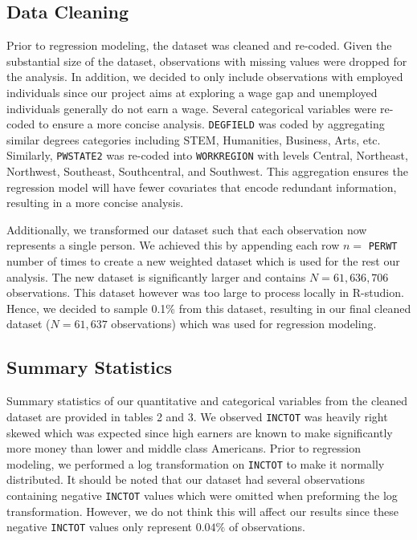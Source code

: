 \documentclass{article}
\begin{document}
\subsection*{Data Cleaning}
Prior to regression modeling, the dataset was cleaned and re-coded. Given the substantial size of the dataset, observations with missing values were dropped for the analysis. In addition, we decided to only include observations with employed individuals since our project aims at exploring a wage gap and unemployed individuals generally do not earn a wage. Several categorical variables were re-coded to ensure a more concise analysis. \texttt{DEGFIELD} was coded by aggregating similar degrees categories including STEM, Humanities, Business, Arts, etc. Similarly, \texttt{PWSTATE2} was re-coded into \texttt{WORKREGION} with levels Central, Northeast, Northwest, Southeast, Southcentral, and Southwest. This aggregation ensures the regression model will have fewer covariates that encode redundant information, resulting in a more concise analysis. 

Additionally, we transformed our dataset such that each observation now represents a single person. We achieved this by appending each row $n = $ \texttt{PERWT} number of times to create a new weighted dataset which is used for the rest our analysis. The new dataset is significantly larger and contains $N = 61,636,706$ observations. This dataset however was too large to process locally in R-studion. Hence, we decided to sample 0.1\% from this dataset, resulting in our final cleaned dataset ($N = 61,637$ observations)  which was used for regression modeling. 

\subsection*{Summary Statistics}
Summary statistics of our quantitative and categorical variables from the cleaned dataset are provided in tables 2 and 3. We observed \texttt{INCTOT} was heavily right skewed which was expected since high earners are known to make significantly more money than lower and middle class Americans. Prior to regression modeling, we performed a log transformation on \texttt{INCTOT} to make it normally distributed. It should be noted that our dataset had several observations containing negative \texttt{INCTOT} values which were omitted when preforming the log transformation. However, we do not think this will affect our results since these negative \texttt{INCTOT} values only represent $0.04\%$ of observations.
\end{document}
